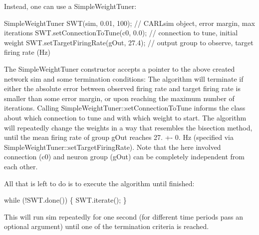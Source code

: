 Instead, one can use a Simple\+Weight\+Tuner\+: 
\begin{DoxyCode}
SimpleWeightTuner SWT(sim, 0.01, 100); \textcolor{comment}{// CARLsim object, error margin, max iterations}
SWT.setConnectionToTune(c0, 0.0);      \textcolor{comment}{// connection to tune, initial weight}
SWT.setTargetFiringRate(gOut, 27.4);   \textcolor{comment}{// output group to observe, target firing rate (Hz)}
\end{DoxyCode}
 The Simple\+Weight\+Tuner constructor accepts a pointer to the above created network {\ttfamily sim} and some termination conditions\+: The algorithm will terminate if either the absolute error between observed firing rate and target firing rate is smaller than some error margin, or upon reaching the maximum number of iterations. Calling Simple\+Weight\+Tuner\+::set\+Connection\+To\+Tune informs the class about which connection to tune and with which weight to start. The algorithm will repeatedly change the weights in a way that resembles the bisection method, until the mean firing rate of group {\ttfamily g\+Out} reaches 27. +-\/ 0. Hz (specified via Simple\+Weight\+Tuner\+::set\+Target\+Firing\+Rate). Note that the here involved connection ({\ttfamily c0}) and neuron group ({\ttfamily g\+Out}) can be completely independent from each other.

All that is left to do is to execute the algorithm until finished\+: 
\begin{DoxyCode}
\textcolor{keywordflow}{while} (!SWT.done()) \{
    SWT.iterate();
\}
\end{DoxyCode}
 This will run {\ttfamily sim} repeatedly for one second (for different time periods pass an optional argument) until one of the termination criteria is reached.

